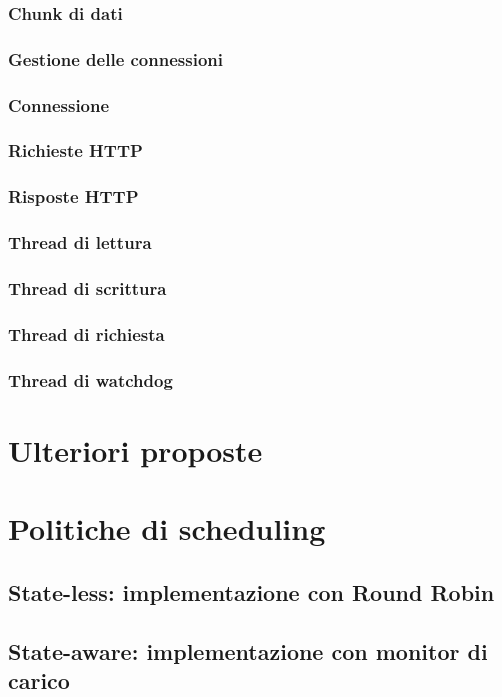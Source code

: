 \documentclass[italian]{tktltiki2}
\begin{document}
\subsubsection*{Chunk di dati}
\subsubsection{Gestione delle connessioni}
\subsubsection*{Connessione}
\subsubsection*{Richieste HTTP}
\subsubsection*{Risposte HTTP}
\subsubsection{Thread di lettura}
\subsubsection{Thread di scrittura}
\subsubsection{Thread di richiesta}
\subsubsection{Thread di watchdog}

\newpage
\section{Ulteriori proposte}

\newpage
\section{Politiche di scheduling}
\subsection{State-less: implementazione con Round Robin}
\subsection{State-aware: implementazione con monitor di carico}
\end{document}

